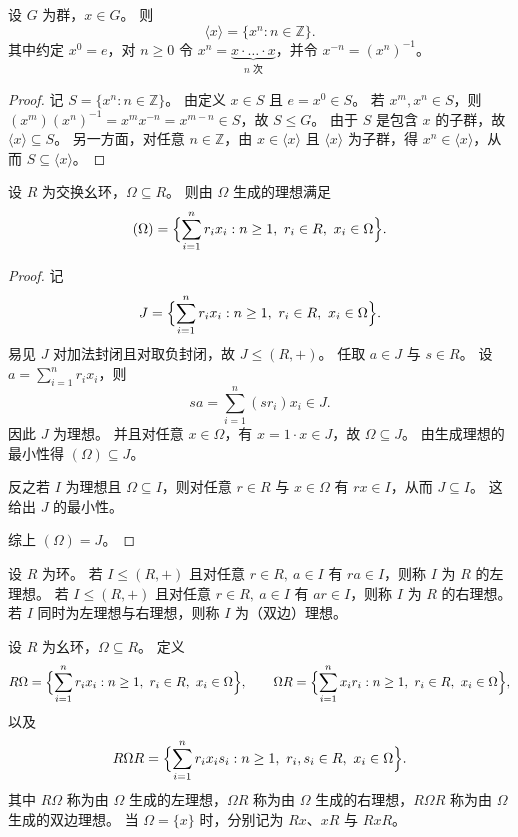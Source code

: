 \documentclass[lang=cn,a4paper,newtx]{elegantbook}
\begin{document}
\begin{proposition}
设 $G$ 为群，$x\in G$。
则
\[
  \langle x\rangle=\{x^n:n\in \mathbb{Z}\}.
\]
其中约定 $x^0=e$，对 $n\ge 0$ 令 $x^n=\underbrace{x\cdot\ldots\cdot x}_{n\text{ 次}}$，并令 $x^{-n}=(x^n)^{-1}$。
\end{proposition}

\begin{proof}
记 $S=\{x^n:n\in \mathbb{Z}\}$。
由定义 $x\in S$ 且 $e=x^0\in S$。
若 $x^m,x^n\in S$，则 $(x^m)(x^n)^{-1}=x^mx^{-n}=x^{m-n}\in S$，故 $S\le G$。
由于 $S$ 是包含 $x$ 的子群，故 $\langle x\rangle\subseteq S$。
另一方面，对任意 $n\in \mathbb{Z}$，由 $x\in \langle x\rangle$ 且 $\langle x\rangle$ 为子群，得 $x^n\in \langle x\rangle$，从而 $S\subseteq \langle x\rangle$。
\end{proof}

\begin{proposition}
设 $R$ 为交换幺环，$\Omega\subseteq R$。
则由 $\Omega$ 生成的理想满足
\[
  (\Omega)=\Bigl\{\sum_{i=1}^n r_ix_i: n\ge 1,\ r_i\in R,\ x_i\in \Omega\Bigr\}.
\]
\end{proposition}

\begin{proof}
记
\[
  J=\Bigl\{\sum_{i=1}^n r_ix_i: n\ge 1,\ r_i\in R,\ x_i\in \Omega\Bigr\}.
\]
易见 $J$ 对加法封闭且对取负封闭，故 $J\le (R,+)$。
任取 $a\in J$ 与 $s\in R$。
设 $a=\sum_{i=1}^n r_ix_i$，则
\[
  sa=\sum_{i=1}^n (sr_i)x_i\in J.
\]
因此 $J$ 为理想。
并且对任意 $x\in \Omega$，有 $x=1\cdot x\in J$，故 $\Omega\subseteq J$。
由生成理想的最小性得 $(\Omega)\subseteq J$。

反之若 $I$ 为理想且 $\Omega\subseteq I$，则对任意 $r\in R$ 与 $x\in \Omega$ 有 $rx\in I$，从而 $J\subseteq I$。
这给出 $J$ 的最小性。

综上 $(\Omega)=J$。
\end{proof}

\begin{definition}[左理想与右理想]
设 $R$ 为环。
若 $I\le (R,+)$ 且对任意 $r\in R,\ a\in I$ 有 $ra\in I$，则称 $I$ 为 $R$ 的左理想。
若 $I\le (R,+)$ 且对任意 $r\in R,\ a\in I$ 有 $ar\in I$，则称 $I$ 为 $R$ 的右理想。
若 $I$ 同时为左理想与右理想，则称 $I$ 为（双边）理想。
\end{definition}

\begin{definition}
设 $R$ 为幺环，$\Omega\subseteq R$。
定义
\[
  R\Omega=\Bigl\{\sum_{i=1}^n r_ix_i: n\ge 1,\ r_i\in R,\ x_i\in \Omega\Bigr\},
\qquad
  \Omega R=\Bigl\{\sum_{i=1}^n x_ir_i: n\ge 1,\ r_i\in R,\ x_i\in \Omega\Bigr\},
\]
以及
\[
  R\Omega R=\Bigl\{\sum_{i=1}^n r_ix_is_i: n\ge 1,\ r_i,s_i\in R,\ x_i\in \Omega\Bigr\}.
\]
其中 $R\Omega$ 称为由 $\Omega$ 生成的左理想，$\Omega R$ 称为由 $\Omega$ 生成的右理想，$R\Omega R$ 称为由 $\Omega$ 生成的双边理想。
当 $\Omega=\{x\}$ 时，分别记为 $Rx$、$xR$ 与 $RxR$。
\end{definition}
\end{document}
